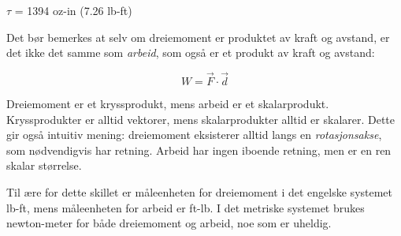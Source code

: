 $\tau$ = 1394 oz-in (7.26 lb-ft) 

\vskip 10pt

Det bør bemerkes at selv om dreiemoment er produktet av kraft og avstand, er det ikke det samme som {\it arbeid}, som også er et produkt av kraft og avstand:

$$W = \vec F \cdot \vec d$$

Dreiemoment er et kryssprodukt, mens arbeid er et skalarprodukt. Kryssprodukter er alltid vektorer, mens skalarprodukter alltid er skalarer. Dette gir også intuitiv mening: dreiemoment eksisterer alltid langs en {\it rotasjonsakse}, som nødvendigvis har retning. Arbeid har ingen iboende retning, men er en ren skalar størrelse.

Til ære for dette skillet er måleenheten for dreiemoment i det engelske systemet lb-ft, mens måleenheten for arbeid er ft-lb. I det metriske systemet brukes newton-meter for både dreiemoment og arbeid, noe som er uheldig.



